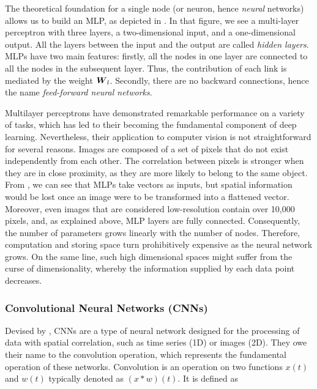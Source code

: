The theoretical foundation for a single node (or neuron, hence \textit{neural} networks) allows us to build an MLP, as depicted in . In that figure, we see a multi-layer perceptron with three layers, a two-dimensional input, and a one-dimensional output. All the layers between the input and the output are called \textit{hidden layers}. MLPs have two main features: firstly, all the nodes in one layer are connected to all the nodes in the subsequent layer. Thus, the contribution of each link is mediated by the weight $\boldsymbol{W}_l$. Secondly, there are no backward connections, hence the name \textit{feed-forward neural networks}.

Multilayer perceptrons have demonstrated remarkable performance on a variety of tasks, which has led to their becoming the fundamental component of deep learning. Nevertheless, their application to computer vision is not straightforward for several reasons. Images are composed of a set of pixels that do not exist independently from each other. The correlation between pixels is stronger when they are in close proximity, as they are more likely to belong to the same object. From , we can see that MLPs take vectors as inputs, but spatial information would be lost once an image were to be transformed into a flattened vector. Moreover, even images that are considered low-resolution contain over 10,000 pixels, and, as explained above, MLP layers are fully connected. Consequently, the number of parameters grows linearly with the number of nodes. Therefore, computation and storing space turn prohibitively expensive as the neural network grows. On the same line, such high dimensional spaces might suffer from the curse of dimensionality, whereby the information supplied by each data point decreases.

\subsubsection{Convolutional Neural Networks (CNNs)} Devised by , CNNs are a type of neural network designed for the processing of data with spatial correlation, such as time series (1D) or images (2D). They owe their name to the convolution operation, which represents the fundamental operation of these networks. Convolution is an operation on two functions $x(t)$ and $w(t)$ typically denoted as $(x\ast w)(t)$. It is defined as

